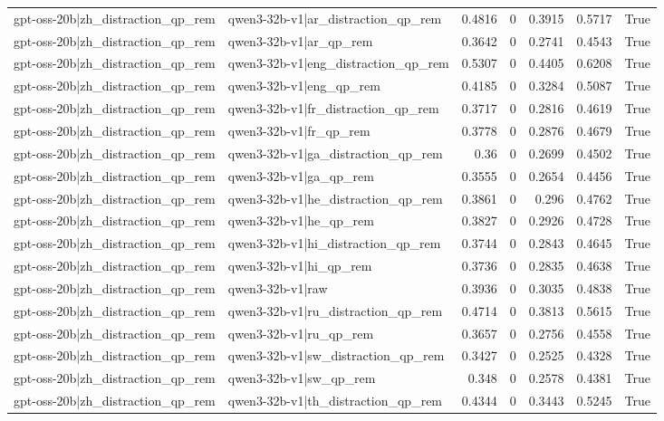 \begin{table}
\begin{tabular}{l l r r r r l}
gpt-oss-20b|zh_distraction_qp_rem & qwen3-32b-v1|ar_distraction_qp_rem & 0.4816 & 0 & 0.3915 & 0.5717 & True \\
gpt-oss-20b|zh_distraction_qp_rem & qwen3-32b-v1|ar_qp_rem & 0.3642 & 0 & 0.2741 & 0.4543 & True \\
gpt-oss-20b|zh_distraction_qp_rem & qwen3-32b-v1|eng_distraction_qp_rem & 0.5307 & 0 & 0.4405 & 0.6208 & True \\
gpt-oss-20b|zh_distraction_qp_rem & qwen3-32b-v1|eng_qp_rem & 0.4185 & 0 & 0.3284 & 0.5087 & True \\
gpt-oss-20b|zh_distraction_qp_rem & qwen3-32b-v1|fr_distraction_qp_rem & 0.3717 & 0 & 0.2816 & 0.4619 & True \\
gpt-oss-20b|zh_distraction_qp_rem & qwen3-32b-v1|fr_qp_rem & 0.3778 & 0 & 0.2876 & 0.4679 & True \\
gpt-oss-20b|zh_distraction_qp_rem & qwen3-32b-v1|ga_distraction_qp_rem & 0.36 & 0 & 0.2699 & 0.4502 & True \\
gpt-oss-20b|zh_distraction_qp_rem & qwen3-32b-v1|ga_qp_rem & 0.3555 & 0 & 0.2654 & 0.4456 & True \\
gpt-oss-20b|zh_distraction_qp_rem & qwen3-32b-v1|he_distraction_qp_rem & 0.3861 & 0 & 0.296 & 0.4762 & True \\
gpt-oss-20b|zh_distraction_qp_rem & qwen3-32b-v1|he_qp_rem & 0.3827 & 0 & 0.2926 & 0.4728 & True \\
gpt-oss-20b|zh_distraction_qp_rem & qwen3-32b-v1|hi_distraction_qp_rem & 0.3744 & 0 & 0.2843 & 0.4645 & True \\
gpt-oss-20b|zh_distraction_qp_rem & qwen3-32b-v1|hi_qp_rem & 0.3736 & 0 & 0.2835 & 0.4638 & True \\
gpt-oss-20b|zh_distraction_qp_rem & qwen3-32b-v1|raw & 0.3936 & 0 & 0.3035 & 0.4838 & True \\
gpt-oss-20b|zh_distraction_qp_rem & qwen3-32b-v1|ru_distraction_qp_rem & 0.4714 & 0 & 0.3813 & 0.5615 & True \\
gpt-oss-20b|zh_distraction_qp_rem & qwen3-32b-v1|ru_qp_rem & 0.3657 & 0 & 0.2756 & 0.4558 & True \\
gpt-oss-20b|zh_distraction_qp_rem & qwen3-32b-v1|sw_distraction_qp_rem & 0.3427 & 0 & 0.2525 & 0.4328 & True \\
gpt-oss-20b|zh_distraction_qp_rem & qwen3-32b-v1|sw_qp_rem & 0.348 & 0 & 0.2578 & 0.4381 & True \\
gpt-oss-20b|zh_distraction_qp_rem & qwen3-32b-v1|th_distraction_qp_rem & 0.4344 & 0 & 0.3443 & 0.5245 & True \\

\end{tabular}
\end{table}

